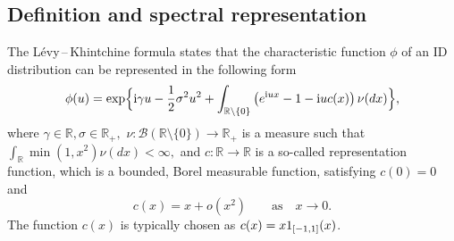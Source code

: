 \documentclass[a4paper,11pt]{article}
\theoremstyle{definition}
\newcommand{\I}{{\rm{1}}}
\newcommand{\R}{{\mathbb{R}}}
\newcommand{\1}{\mathbb{I}}
\renewcommand{\i}{\mathrm{i}}
\def\R{\mathbb{R}}
\newcommand{\B}{\mathcal{B}}%
\newtheorem{defi}{Definition}
\theoremstyle{remark}
\begin{document}
 \subsection{Definition and spectral representation}\label{sec21}
The  L{\'e}vy\,--\,Khintchine formula states that the characteristic function \(\phi\) of an ID distribution can be represented in the following form \begin{eqnarray} \label{LC}
    \phi(u)
    =
    \exp\Bigl\{
      \i \gamma u-\frac{1}{2}\sigma^2 u^2
			    +
		    \int_{\mathbb{R}\setminus \{0\}}
		    \left( 
		    		e^{\i u x}-1 - \i u c(x) 		\right)			\nu(dx)\Bigr\},
\end{eqnarray}
where \(\gamma \in \R, \sigma \in \R_+,\) \(\nu: \B(\R \setminus \{0\}) \to \R_+\) is a measure such that  \(\int_{\R}  \min(1, x^2)\nu(dx) < \infty,\)  and 
$c: \mathbb{R} \rightarrow \mathbb{R}$ is a so-called representation function, which is a bounded, Borel measurable function, satisfying \(c(0)=0\) and
\begin{equation}\label{repr_function}
c(x) = x+ o(x^2) \qquad \text{as} \quad x \to 0.
\end{equation}
The function $c(x)$ is typically chosen as $c(x) = x\I_{[-1, 1]}(x)$.%
\end{document}
